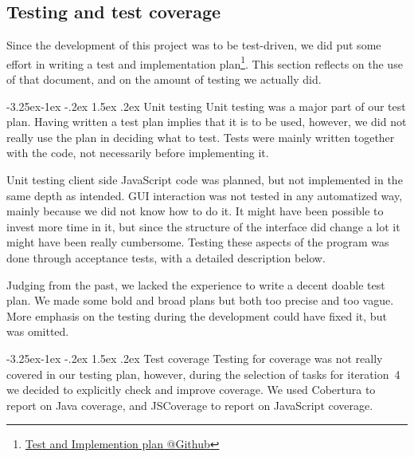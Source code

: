 \documentclass[a4paper]{article}
\makeatletter
\renewcommand\paragraph{\@startsection{paragraph}{4}{\z@}%
  {-3.25ex\@plus -1ex \@minus -.2ex}%
  {1.5ex \@plus .2ex}%
  {\normalfont\normalsize\bfseries}}
\newcommand{\urlTestImplementation}{https://github.com/FelixAkk/synthbio/raw/master/deliverables/test-implementation/test-implementation.pdf}
\newcommand{\hrefTestImplementation}{\href{\urlTestImplementation}{Test and Implemention plan @Github}}
\makeatother
\begin{document}
\subsection{Testing and test coverage}
\label{process-testing}

Since the development of this project was to be test-driven, we did put some effort in writing a test and implementation plan\footnote{\hrefTestImplementation}. This section reflects on the use of that document, and on the amount of testing we actually did.

\paragraph{Unit testing}
Unit testing was a major part of our test plan. Having written a test plan implies that it is to be used, however, we did not really use the plan in deciding what to test. Tests were mainly written together with the code, not necessarily before implementing it.

Unit testing client side JavaScript code was planned, but not implemented in the same depth as intended. GUI interaction was not tested in any automatized way, mainly because we did not know how to do it. It might have been possible to invest more time in it, but since the structure of the interface did change a lot it might have been really cumbersome. Testing these aspects of the program was done through acceptance tests, with a detailed description below.

Judging from the past, we lacked the experience to write a decent doable test plan. We made some bold and broad plans but both too precise and too vague. More emphasis on the testing during the development could have fixed it, but was omitted.

\paragraph{Test coverage}
Testing for coverage was not really covered in our testing plan, however, during the selection of tasks for iteration~4 we decided to explicitly check and improve coverage. We used Cobertura to report on Java coverage, and JSCoverage to report on JavaScript coverage.
\end{document}
